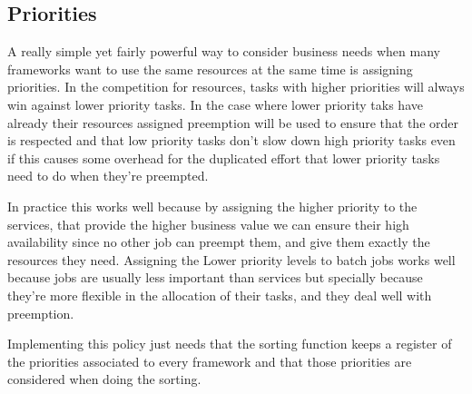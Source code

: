 \documentclass{report}                     %
\begin{document}
\label{sec:businessrelevance}

\subsection{Priorities}

A really simple yet fairly powerful way to consider business needs
when many frameworks want to use the same resources at the same time
is assigning priorities. In the competition for resources, tasks with
higher priorities will always win against lower priority tasks. In the
case where lower priority taks have already their resources assigned
preemption will be used to ensure that the order is respected and that
low priority tasks don't slow down high priority tasks even if this
causes some overhead for the duplicated effort that lower priority
tasks need to do when they're preempted.

In practice this works well because by assigning the higher priority
to the services, that provide the higher business value  we can
ensure their high availability since no other job can preempt them,
and give them exactly the resources they need. Assigning the Lower
priority levels to batch jobs works well because jobs are usually less
important than services but specially because they're more flexible in
the allocation of their tasks, and they deal well with preemption.

Implementing this policy just needs that the sorting function keeps a
register of the priorities associated to every framework and that
those priorities are considered when doing the sorting.



\end{document}
